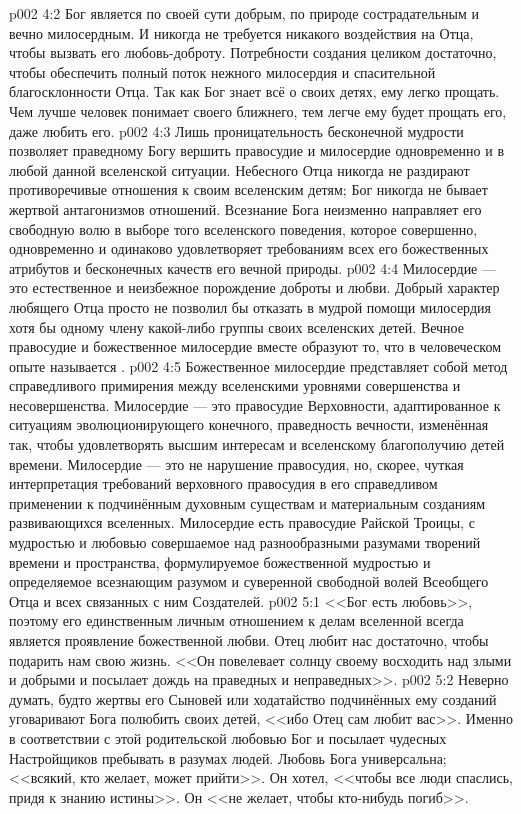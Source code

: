 \vs p002 4:2 Бог является по своей сути добрым, по природе сострадательным и вечно милосердным. И никогда не требуется никакого воздействия на Отца, чтобы вызвать его любовь\hyp{}доброту. Потребности создания целиком достаточно, чтобы обеспечить полный поток нежного милосердия и спасительной благосклонности Отца. Так как Бог знает всё о своих детях, ему легко прощать. Чем лучше человек понимает своего ближнего, тем легче ему будет прощать его, даже любить его.
\vs p002 4:3 \pc Лишь проницательность бесконечной мудрости позволяет праведному Богу вершить правосудие и милосердие одновременно и в любой данной вселенской ситуации. Небесного Отца никогда не раздирают противоречивые отношения к своим вселенским детям; Бог никогда не бывает жертвой антагонизмов отношений. Всезнание Бога неизменно направляет его свободную волю в выборе того вселенского поведения, которое совершенно, одновременно и одинаково удовлетворяет требованиям всех его божественных атрибутов и бесконечных качеств его вечной природы.
\vs p002 4:4 Милосердие --- это естественное и неизбежное порождение доброты и любви. Добрый характер любящего Отца просто не позволил бы отказать в мудрой помощи милосердия хотя бы одному члену какой\hyp{}либо группы своих вселенских детей. Вечное правосудие и божественное милосердие вместе образуют то, что в человеческом опыте называется .
\vs p002 4:5 Божественное милосердие представляет собой метод справедливого примирения между вселенскими уровнями совершенства и несовершенства. Милосердие --- это правосудие Верховности, адаптированное к ситуациям эволюционирующего конечного, праведность вечности, изменённая так, чтобы удовлетворять высшим интересам и вселенскому благополучию детей времени. Милосердие --- это не нарушение правосудия, но, скорее, чуткая интерпретация требований верховного правосудия в его справедливом применении к подчинённым духовным существам и материальным созданиям развивающихся вселенных. Милосердие есть правосудие Райской Троицы, с мудростью и любовью совершаемое над разнообразными разумами творений времени и пространства, формулируемое божественной мудростью и определяемое всезнающим разумом и суверенной свободной волей Всеобщего Отца и всех связанных с ним Создателей.
\vs p002 5:1 <<Бог есть любовь>>, поэтому его единственным личным отношением к делам вселенной всегда является проявление божественной любви. Отец любит нас достаточно, чтобы подарить нам свою жизнь. <<Он повелевает солнцу своему восходить над злыми и добрыми и посылает дождь на праведных и неправедных>>.
\vs p002 5:2 \pc Неверно думать, будто жертвы его Сыновей или ходатайство подчинённых ему созданий уговаривают Бога полюбить своих детей, <<ибо Отец сам любит вас>>. Именно в соответствии с этой родительской любовью Бог и посылает чудесных Настройщиков пребывать в разумах людей. Любовь Бога универсальна; <<всякий, кто желает, может прийти>>. Он хотел, <<чтобы все люди спаслись, придя к знанию истины>>. Он <<не желает, чтобы кто\hyp{}нибудь погиб>>.
